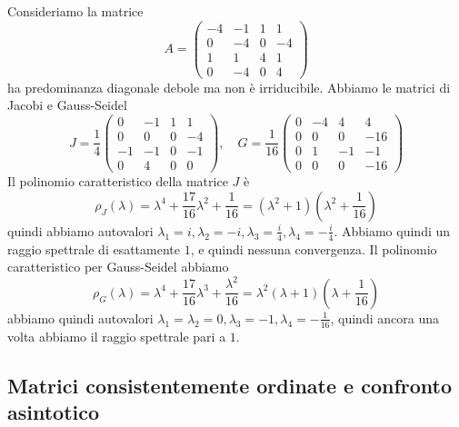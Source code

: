\documentclass[a4paper]{article}
\begin{document}
\begin{snippetexample}{}
    Consideriamo la matrice
    \[
        A =
        \begin{pmatrix}
            -4 & -1 & 1 & 1 \\
            0 & -4 & 0 & -4 \\
            1 & 1 & 4 & 1 \\
            0 & -4 & 0 & 4
        \end{pmatrix}
    \]
    ha predominanza diagonale debole ma non è irriducibile.
    Abbiamo le matrici di Jacobi e Gauss-Seidel \[
        J = \frac14
        \begin{pmatrix}
            0 & -1 & 1 & 1 \\
            0 & 0 & 0 & -4 \\
            -1 & -1 & 0 & -1 \\
            0 & 4 & 0 & 0
        \end{pmatrix},
        \quad
        G = \frac{1}{16}
        \begin{pmatrix}
            0 & -4 & 4 & 4 \\
            0 & 0 & 0 & -16 \\
            0 & 1 & -1 & -1 \\
            0 & 0 & 0 & -16
        \end{pmatrix}
    \]
    Il polinomio caratteristico della matrice \(J\) è
    \[
        \rho_J(\lambda) =
        \lambda^4 + \frac{17}{16}\lambda^2 + \frac{1}{16}
        = \left(\lambda^2 + 1\right)\left(\lambda^2 + \frac{1}{16}\right)
    \]
    quindi abbiamo autovalori \(\lambda_1 = i, \lambda_2 = -i, \lambda_3 = \frac{i}{4}, \lambda_4 = -\frac{i}{4}\).
    Abbiamo quindi un raggio spettrale di esattamente \(1\), e quindi nessuna convergenza.
    Il polinomio caratteristico per Gauss-Seidel abbiamo
    \[
        \rho_G(\lambda) = \lambda^4 + \frac{17}{16}\lambda^3 + \frac{\lambda^2}{16}
        = \lambda^2\left(\lambda + 1\right)\left(\lambda + \frac{1}{16}\right)
    \]
    abbiamo quindi autovalori
    \(\lambda_1 = \lambda_2 = 0, \lambda_3 = -1, \lambda_4 = -\frac{1}{16}\),
    quindi ancora una volta abbiamo il raggio spettrale pari a \(1\).
\end{snippetexample}

\subsection{Matrici consistentemente ordinate e confronto asintotico}
\end{document}
